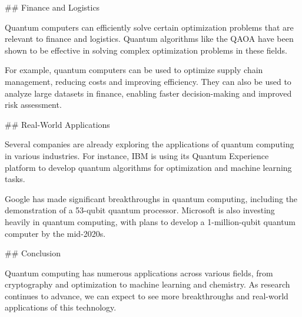 ## Finance and Logistics

Quantum computers can efficiently solve certain optimization problems that are relevant to finance and logistics. Quantum algorithms like the QAOA have been shown to be effective in solving complex optimization problems in these fields.

For example, quantum computers can be used to optimize supply chain management, reducing costs and improving efficiency. They can also be used to analyze large datasets in finance, enabling faster decision-making and improved risk assessment.

## Real-World Applications

Several companies are already exploring the applications of quantum computing in various industries. For instance, IBM is using its Quantum Experience platform to develop quantum algorithms for optimization and machine learning tasks.

Google has made significant breakthroughs in quantum computing, including the demonstration of a 53-qubit quantum processor. Microsoft is also investing heavily in quantum computing, with plans to develop a 1-million-qubit quantum computer by the mid-2020s.

## Conclusion

Quantum computing has numerous applications across various fields, from cryptography and optimization to machine learning and chemistry. As research continues to advance, we can expect to see more breakthroughs and real-world applications of this technology.